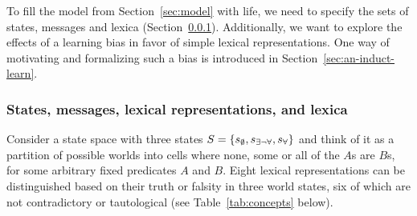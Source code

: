 \documentclass[a4paper, 11pt]{article}
\theoremstyle{Satz}
\newcommand{\set}[1]{\left\{#1\right\}}
\newcommand{\States}{\ensuremath{S}\xspace}		%
\newcommand{\state}{\ensuremath{s}\xspace}		%
\newcommand{\mystate}[1]{\ensuremath{\state_{\text{#1}}}\xspace} %
\newcommand{\ssome}{\mystate{\ensuremath{\exists\neg\forall}}}
\newcommand{\sall}{\mystate{\ensuremath{\forall}}}
\newcommand{\snone}{\mystate{\ensuremath{\emptyset}}}
\begin{document}
To fill the model from Section~\ref{sec:model} with life, we need to specify the sets of
states, messages and lexica (Section~\ref{sec:stat-mess-conc}). Additionally, we want to
explore the effects of a learning bias in favor of simple lexical representations. One way of
motivating and formalizing such a bias is introduced in Section~\ref{sec:an-induct-learn}.


\subsubsection{States, messages, lexical representations, and lexica} 
\label{sec:stat-mess-conc}

Consider a state space with three states $\States = \set{\snone, \ssome, \sall}$ and think of
it as a partition of possible worlds into cells where none, some or all of the $A$s are $B$s,
for some arbitrary fixed predicates $A$ and $B$. Eight lexical representations can be distinguished based on
their truth or falsity in three world states, six of which are not contradictory or
tautological (see Table~\ref{tab:concepts} below).
\end{document}
